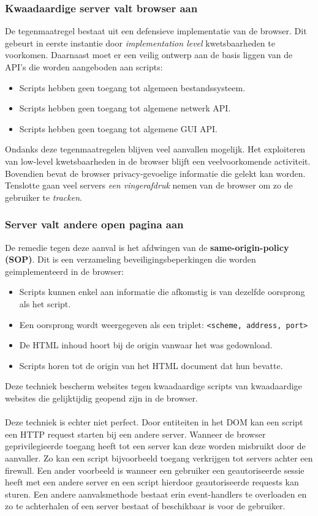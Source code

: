 \documentclass[../main.tex]{subfiles}
\begin{document}
\subsubsection{Kwaadaardige server valt browser aan}
De tegenmaatregel bestaat uit een defensieve implementatie van de browser. Dit gebeurt in eerste instantie door \textit{implementation level} kwetsbaarheden te voorkomen. Daarnaast moet er een veilig ontwerp aan de basis liggen van de API's die worden aangeboden aan scripts:
\begin{itemize}
	\item Scripts hebben geen toegang tot algemeen bestandssysteem.
	\item Scripts hebben geen toegang tot algemene netwerk API.
	\item Scripts hebben geen toegang tot algemene GUI API.
\end{itemize}
Ondanks deze tegenmaatregelen blijven veel aanvallen mogelijk. Het exploiteren van low-level kwetsbaarheden in de browser blijft een veelvoorkomende activiteit. Bovendien bevat de browser privacy-gevoelige informatie die gelekt kan worden. Tenslotte gaan veel servers \textit{een vingerafdruk} nemen van de browser om zo de gebruiker te \textit{tracken}.

\subsubsection{Server valt andere open pagina aan}
De remedie tegen deze aanval is het afdwingen van de \textbf{same-origin-policy (SOP)}. Dit is een verzameling beveiligingsbeperkingen die worden geimplementeerd in de browser:
\begin{itemize}
	\item Scripts kunnen enkel aan informatie die afkomstig is van dezelfde oorsprong als het script. 
	\item Een oorsprong wordt weergegeven als een triplet:  \texttt{<scheme, address, port>}
	\item De HTML inhoud hoort bij de origin vanwaar het was gedownload.
	\item Scripts horen tot de origin van het HTML document dat hun bevatte.
\end{itemize} 
Deze techniek bescherm websites tegen kwaadaardige scripts van kwaadaardige websites die gelijktijdig geopend zijn in de browser. 
\\\\
Deze techniek is echter niet perfect. Door entiteiten in het DOM kan een script een HTTP request starten bij een andere server. Wanneer de browser geprivilegieerde toegang heeft tot een server kan deze worden misbruikt door de aanvaller. Zo kan een script bijvoorbeeld toegang verkrijgen tot servers achter een firewall. Een ander voorbeeld is wanneer een gebruiker een geautoriseerde sessie heeft met een andere server en een script hierdoor geautoriseerde requests kan sturen. Een andere aanvalsmethode bestaat erin event-handlers te overloaden en zo te achterhalen of een server bestaat of beschikbaar is voor de gebruiker.
\end{document}
